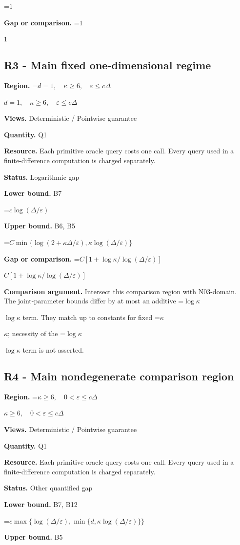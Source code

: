\documentclass[10pt,a4paper]{article}
\newcommand{\AtlasMath}[1]{\par\begingroup\centering\setbox0=\hbox{$\displaystyle #1$}\ifdim\wd0>1.4\linewidth\typeout{ATLAS WIDE FORMULA: \the\wd0}\fi\ifdim\wd0>\linewidth\resizebox{\linewidth}{!}{\box0}\else\box0\fi\par\endgroup}
\newcommand{\AtlasInlineMath}[1]{\begingroup\setbox0=\hbox{$#1$}\ifdim\wd0>.4\linewidth\endgroup\AtlasMath{#1}\else\endgroup$#1$\fi}
\begin{document}
\AtlasMath{1}
\textbf{Gap or comparison.} \AtlasInlineMath{1}

\subsection{R3 - Main fixed one-dimensional regime}
\textbf{Region.} \AtlasInlineMath{d=1,\quad\kappa\ge6,\quad\varepsilon\le c\Delta}

\textbf{Views.} Deterministic / Pointwise guarantee

\textbf{Quantity.} Q1

\textbf{Resource.} Each primitive oracle query costs one call. Every query used in a finite-difference computation is charged separately.

\textbf{Status.} Logarithmic gap

\textbf{Lower bound.} B7

\AtlasMath{c\log(\Delta/\varepsilon)}
\textbf{Upper bound.} B6, B5

\AtlasMath{C\min\{\log(2+\kappa\Delta/\varepsilon),\kappa\log(\Delta/\varepsilon)\}}
\textbf{Gap or comparison.} \AtlasInlineMath{C[1+\log\kappa/\log(\Delta/\varepsilon)]}

\textbf{Comparison argument.} Intersect this comparison region with N03-domain. The joint-parameter bounds differ by at most an additive \AtlasInlineMath{\log\kappa} term. They match up to constants for fixed \AtlasInlineMath{\kappa}; necessity of the \AtlasInlineMath{\log\kappa} term is not asserted.

\subsection{R4 - Main nondegenerate comparison region}
\textbf{Region.} \AtlasInlineMath{\kappa\ge6,\quad0<\varepsilon\le c\Delta}

\textbf{Views.} Deterministic / Pointwise guarantee

\textbf{Quantity.} Q1

\textbf{Resource.} Each primitive oracle query costs one call. Every query used in a finite-difference computation is charged separately.

\textbf{Status.} Other quantified gap

\textbf{Lower bound.} B7, B12

\AtlasMath{c\max\{\log(\Delta/\varepsilon),\min\{d,\kappa\log(\Delta/\varepsilon)\}\}}
\textbf{Upper bound.} B5
\end{document}
